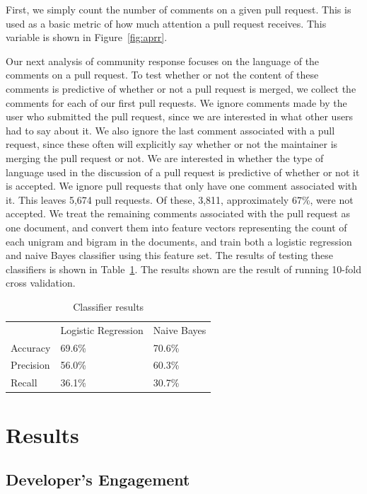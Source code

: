 \documentclass{sigchi}
\begin{document}
First, we simply count the number of comments on a given pull request. This is
used as a basic metric of how much attention a pull request receives. This
variable is shown in Figure~\ref{fig:aprr}.

Our next analysis of community response focuses on the language of the comments
on a pull request. To test whether or not the content of these comments is
predictive of whether or not a pull request is merged, we collect the comments
for each of our first pull requests. We ignore comments made by the user who
submitted the pull request, since we are interested in what other users had to
say about it. We also ignore the last comment associated with a pull request,
since these often will explicitly say whether or not the maintainer is merging
the pull request or not.  We are interested in whether the type of language used
in the discussion of a pull request is predictive of whether or not it is
accepted. We ignore pull requests that only have one comment associated with it.
This leaves 5,674 pull requests. Of these, 3,811, approximately 67\%, were not
accepted. We treat the remaining comments associated with the pull request as
one document, and convert them into feature vectors representing the count of
each unigram and bigram in the documents, and train both a logistic regression
and naive Bayes classifier using this feature set. The results of testing these
classifiers is shown in Table~\ref{tbl:classifiers}. The results shown are the
result of running 10-fold cross validation.

\begin{table}[ht] \centering
  \caption{Classifier results}
  \label{tbl:classifiers}
  \begin{tabular}{lll}
  \hline\hline
  ~         & Logistic Regression & Naive Bayes \\
  Accuracy  & 69.6\%              & 70.6\%      \\
  Precision & 56.0\%              & 60.3\%      \\
  Recall    & 36.1\%              & 30.7\%      \\
  \hline
  \end{tabular}
\end{table}

\section{Results} \label{chap:results}

\subsection{Developer's Engagement} \label{results_engagement}
\end{document}
